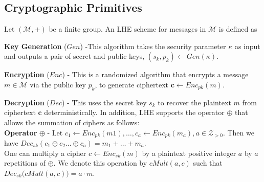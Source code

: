 \subsection{Cryptographic Primitives}
Let $(\mathcal{M}, +)$ be a finite group. An \textsf{LHE} scheme
for messages in $\mathcal{M}$ is defined  as \squishlist
\item \textbf{Key Generation }($Gen$) -This  algorithm takes the security parameter $\kappa$ as input and outputs
a pair of secret and public keys, $(s_k, p_k) \leftarrow Gen(\kappa)$.
\item \textbf{Encryption} ($Enc$) - This is a randomized algorithm that encrypts a message $m \in \mathcal{M}$ via the public key $p_k$, to generate ciphertext $\mathbf{c} \leftarrow Enc_{pk}(m)$.
\item \textbf{Decryption} ($Dec$) - This uses the secret key $s_k$ to
recover the plaintext $m$ from ciphertext $\mathbf{c}$ deterministically.
\squishend
In addition, \textsf{LHE} supports the operator $\oplus$ that allows the summation of ciphers as follows:
\\ \textbf{Operator} $\oplus$ - Let $c_1 \leftarrow Enc_{pk}(m1), \ldots, c_a \leftarrow Enc_{pk}(m_a), a \in \mathcal{Z}_{>0}$. Then we have  $Dec_{sk}(c_1\oplus c_2 ...\oplus c_a)=    m_1 + \ldots   + m_a$.  \\
One can multiply a cipher $c\leftarrow  Enc_{sk}(m)$ by a plaintext positive integer $a$ by $a$ repetitions of $\oplus$. We denote this operation by $cMult(a,c)$ such that $Dec_{sk}\big(cMult(a,c)\big)=a\cdot m$.

